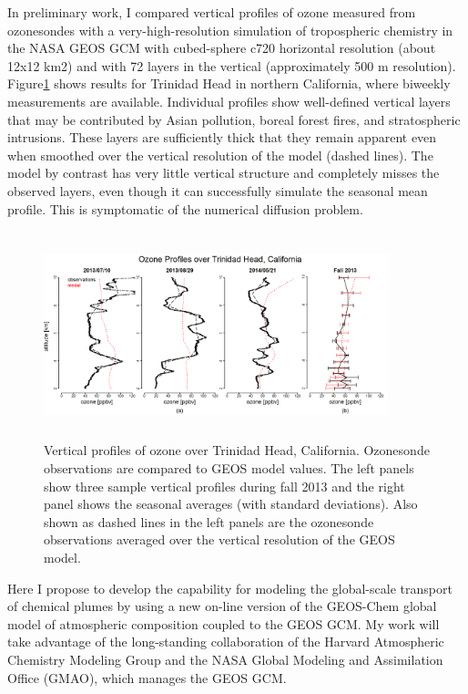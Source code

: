 \documentclass[fleqn, 11pt]{wlscirep}
\begin{document}
In preliminary work, I compared vertical profiles of ozone measured from ozonesondes with a very-high-resolution simulation of tropospheric chemistry in the NASA GEOS GCM with cubed-sphere c720 horizontal resolution (about 12x12 km2) and with 72 layers in the vertical (approximately 500 m resolution). Figure\ref{fig:proposal} shows results for Trinidad Head in northern California, where biweekly measurements are available.\cite{WOUDC} Individual profiles show well-defined vertical layers that may be contributed by Asian pollution, boreal forest fires, and stratospheric intrusions. These layers are sufficiently thick that they remain apparent even when smoothed over the vertical resolution of the model (dashed lines). The model by contrast has very little vertical structure and completely misses the observed layers, even though it can successfully simulate the seasonal mean profile. This is symptomatic of the numerical diffusion problem.\cite{brasseurjacob}\\ 
\begin{figure}[H]
\centering
\includegraphics[width=10cm,height=6cm,keepaspectratio]{proposal}
\caption{Vertical profiles of ozone over Trinidad Head, California. Ozonesonde observations are compared to GEOS model values. The left panels show three sample vertical profiles during fall 2013 and the right panel shows the seasonal averages (with standard deviations). Also shown as dashed lines in the left panels are the ozonesonde observations averaged over  the vertical resolution of the  GEOS model.}
\label{fig:proposal}
\end{figure}
Here I propose to develop the capability for modeling the global-scale transport of chemical plumes by using a new on-line version of the GEOS-Chem global model of atmospheric composition coupled to the GEOS GCM. My work will take advantage of the long-standing collaboration of the Harvard Atmospheric Chemistry Modeling Group and the NASA Global Modeling and Assimilation Office (GMAO), which manages the GEOS GCM.\\ \\
\end{document}
